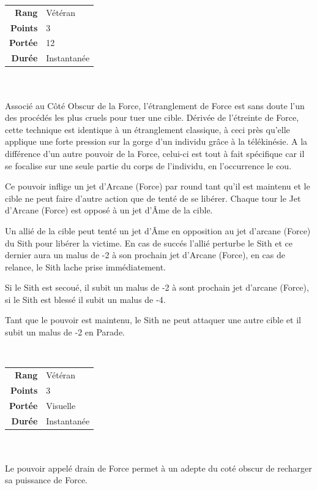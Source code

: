 \begin{description}[align=left]
        \begin{tabular}{ r l }
            \textbf{Rang}    & Vétéran \\
            \textbf{Points}  & 3 \\
            \textbf{Portée}  & 12 \\
            \textbf{Durée}   & Instantanée \\
        \end{tabular}
        \\ \\
        Associé au Côté Obscur de la Force, l'étranglement de Force est sans doute l'un des procédés les plus cruels pour tuer une cible. Dérivée de l'étreinte de Force, cette technique est identique à un étranglement classique, à ceci près qu'elle applique une forte pression sur la gorge d'un individu grâce à la télékinésie. A la différence d'un autre pouvoir de la Force, celui-ci est tout à fait spécifique car il se focalise sur une seule partie du corps de l'individu, en l'occurrence le cou. 

        Ce pouvoir inflige un jet d'Arcane (Force) par round tant qu'il est maintenu et le cible ne peut faire d'autre action que de tenté de se libérer. Chaque tour le Jet d'Arcane (Force) est opposé à un jet d'\^Ame de la cible.

        Un allié de la cible peut tenté un jet d'\^Ame en opposition au jet d'arcane (Force) du Sith pour libérer la victime. En cas de succés l'allié perturbe le Sith et ce dernier aura un malus de -2 à son prochain jet d'Arcane (Force), en cas de relance, le Sith lache prise immédiatement.

        Si le Sith est secoué, il subit un malus de -2 à sont prochain jet d'arcane (Force), si le Sith est blessé il subit un malus de -4.

        Tant que le pouvoir est maintenu, le Sith ne peut attaquer une autre cible et il subit un malus de -2 en Parade.
        \\

    \item [Drain de Force] ~ \\

        \begin{tabular}{ r l }
            \textbf{Rang}    & Vétéran \\
            \textbf{Points}  & 3 \\
            \textbf{Portée}  & Visuelle \\
            \textbf{Durée}   & Instantanée \\
        \end{tabular}
        \\ \\
        Le pouvoir appelé drain de Force permet à un adepte du coté obscur de recharger sa puissance de Force.


\end{description}
